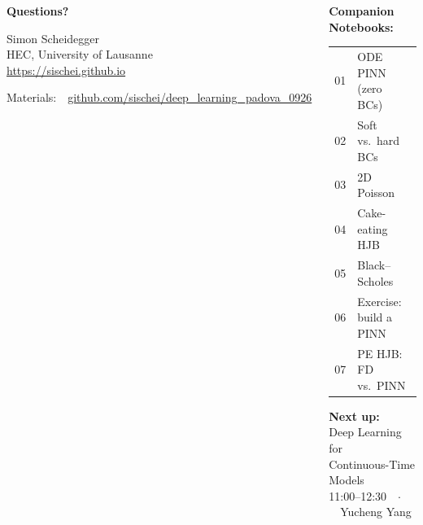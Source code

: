 \documentclass[aspectratio=169,11pt]{beamer}
\begin{document}
\begin{frame}{}
\begin{columns}[c]
\begin{center}
{\Huge \textcolor{uzhblue}{\textbf{Questions?}}}

\vspace{1.0cm}
{\large Simon Scheidegger}\\[4pt]
{\small HEC, University of Lausanne}\\[4pt]
\url{https://sischei.github.io}

\vspace{0.6cm}
{\small Materials:~~\href{https://github.com/sischei/deep_learning_padova_0926}{github.com/sischei/deep\_learning\_padova\_0926}}
\end{center}

\begin{center}
\textbf{Companion Notebooks:}\\[8pt]
{\small
\begin{tabular}{rl}
01 & ODE PINN (zero BCs) \\
02 & Soft vs.\ hard BCs \\
03 & 2D Poisson \\
04 & Cake-eating HJB \\
05 & Black--Scholes \\
06 & Exercise: build a PINN \\
07 & PE HJB: FD vs.\ PINN \\
\end{tabular}
}

\vspace{0.7cm}
\textbf{Next up:}\\[6pt]
{\large Deep Learning for}\\
{\large Continuous-Time Models}\\[6pt]
{\small 11:00--12:30~~$\cdot$~~Yucheng Yang}
\end{center}
\end{columns}
\end{frame}
\end{document}
